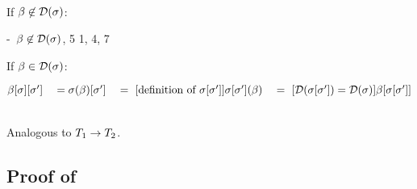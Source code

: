 \begin{bycase}

\Case{$\bool$, $\var$}

\Case{$\tvar$}\\
If $\beta\not\in\mathcal{D}(\sigma)$:
\begin{derivation}
     {\hyp\ $\beta\not\in\mathcal{D}(\sigma)$, 5}
     {1, 4, 7}
\end{derivation}
If $\beta\in\mathcal{D}(\sigma)$:
\begin{links}
$\beta[\sigma][\sigma']
 \\\hspace*{1em}=\\
 \sigma(\beta)[\sigma']
 \\\hspace*{1em}=\ [\mbox{definition of $\sigma[\sigma']$}]\\
 \sigma[\sigma'](\beta)
 \\\hspace*{1em}=\ [\mbox{$\mathcal{D}(\sigma[\sigma'])=\mathcal{D}(\sigma)$}]\\
 \beta[\sigma[\sigma']]$
\end{links}

\Case{$\tarrO$}
\begin{derivation}
\steP
{
 \linK{=}
      {}
 \linK{=}
 }
\end{derivation}

\Case{\restkinds}\\
Analogous to $\tarrO$.

\end{bycase}



\subsection*{Proof of }

